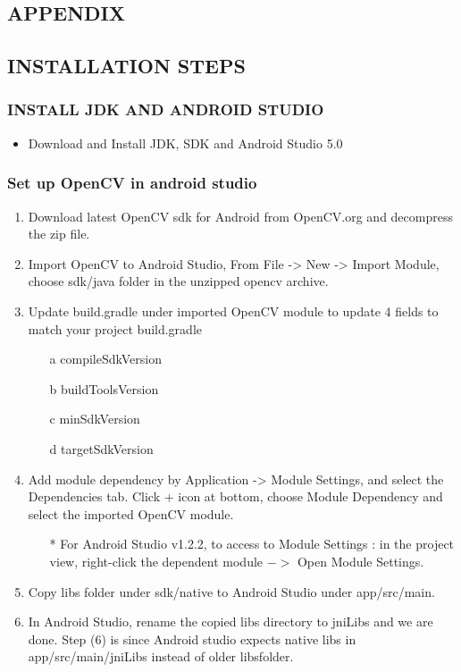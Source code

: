 \documentclass[11pt,a4paper,twoside]{report}
\begin{document}
\begin{appendix}
\chapter{APPENDIX}
\section{INSTALLATION STEPS}
\subsection{INSTALL JDK AND ANDROID STUDIO}
\begin{itemize}
\item Download and Install JDK, SDK and Android Studio 5.0
\end{itemize}
\subsection{Set up OpenCV in android studio}

\begin{enumerate}
\item Download latest OpenCV sdk for Android from OpenCV.org and decompress the zip file.
\item Import OpenCV to Android Studio, From File -> New -> Import Module, choose sdk/java folder in the unzipped opencv archive.
\item Update build.gradle under imported OpenCV module to update 4 fields to match your project build.gradle
\begin{enumerate}
	\item[a] compileSdkVersion
	\item[b] buildToolsVersion
	\item[c] minSdkVersion
	\item[d] targetSdkVersion
\end{enumerate} 
\item Add module dependency by Application -> Module Settings, and select the Dependencies tab. Click + icon at bottom, choose Module Dependency and select the imported OpenCV module.
\begin{itemize}
\item[*] For Android Studio v1.2.2, to access to Module Settings : in the project view, right-click the dependent module $->$ Open Module Settings.
\end{itemize}
\item Copy libs folder under sdk/native to Android Studio under app/src/main.
\item 	In Android Studio, rename the copied libs directory to jniLibs and we are done. Step (6) is since Android studio expects native libs in app/src/main/jniLibs instead of older libsfolder.


\end{enumerate}
\end{appendix}
\end{document}
